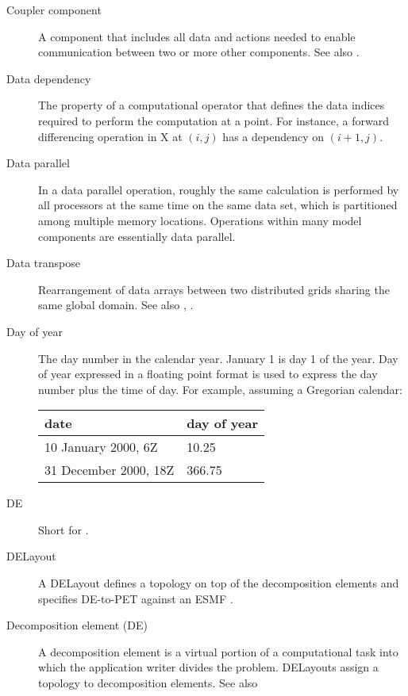 \begin{description}
\item[Coupler component] \label{glos:Coupler}
  A component that includes all data and actions needed to enable 
  communication between two or more other components. 
  See also . 

\item[Data dependency] \label{glos:DataDep} The property of a computational
  operator that defines the data indices required to perform
  the computation at a point.  For instance, a forward differencing
  operation in X at $(i,j)$ has a dependency on $(i+1,j)$.

\item[Data parallel] \label{glos:DataParallel} In a data parallel operation,
  roughly the same calculation is performed by all processors at the same 
  time on the same data set, which is partitioned among multiple memory 
  locations.  Operations within many model components are essentially data 
  parallel.  

\item[Data transpose] \label{glos:DataTranspose} Rearrangement of data arrays 
  between two distributed grids sharing the same global domain.
  See also , 
  .

\item[Day of year] \label{glos:DayOfYear} The day number in the calendar year. 
  January 1 is day 1 of the year. Day of year expressed in a floating point 
  format is used to express the day number plus the time of day. 
  For example, assuming a Gregorian calendar:

\begin{tabular}{ll}
  {\bf date}              & {\bf day of year} \\
  \hline 
  10 January 2000, 6Z     & 10.25 \\
  31 December 2000, 18Z   & 366.75 
\end{tabular}

\item[DE] \label{glos:DE} 
  Short for .

\item[DELayout] \label{glos:DELayout} A DELayout defines a topology on top of
  the decomposition elements and specifies DE-to-PET against an ESMF  
  . 

\item[Decomposition element (DE)] \label{glos:Decomp_Element}
  A decomposition element is a virtual portion of a computational
  task into which the application writer divides the problem.
  DELayouts assign a topology to decomposition elements.
  See also 


\end{description}
